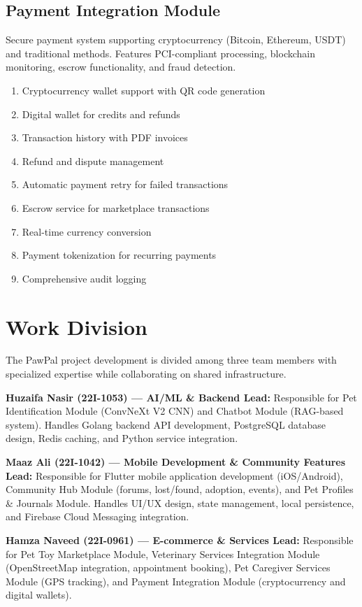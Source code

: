 \subsection{Payment Integration Module}
Secure payment system supporting cryptocurrency (Bitcoin, Ethereum, USDT) and traditional methods. Features PCI-compliant processing, blockchain monitoring, escrow functionality, and fraud detection.
\begin{enumerate}
    \item Cryptocurrency wallet support with QR code generation
    \item Digital wallet for credits and refunds
    \item Transaction history with PDF invoices
    \item Refund and dispute management
    \item Automatic payment retry for failed transactions
    \item Escrow service for marketplace transactions
    \item Real-time currency conversion
    \item Payment tokenization for recurring payments
    \item Comprehensive audit logging
\end{enumerate}

\section{Work Division}

The PawPal project development is divided among three team members with specialized expertise while collaborating on shared infrastructure.

\textbf{Huzaifa Nasir (22I-1053) --- AI/ML \& Backend Lead:} Responsible for Pet Identification Module (ConvNeXt V2 CNN) and Chatbot Module (RAG-based system). Handles Golang backend API development, PostgreSQL database design, Redis caching, and Python service integration.

\textbf{Maaz Ali (22I-1042) --- Mobile Development \& Community Features Lead:} Responsible for Flutter mobile application development (iOS/Android), Community Hub Module (forums, lost/found, adoption, events), and Pet Profiles \& Journals Module. Handles UI/UX design, state management, local persistence, and Firebase Cloud Messaging integration.

\textbf{Hamza Naveed (22I-0961) --- E-commerce \& Services Lead:} Responsible for Pet Toy Marketplace Module, Veterinary Services Integration Module (OpenStreetMap integration, appointment booking), Pet Caregiver Services Module (GPS tracking), and Payment Integration Module (cryptocurrency and digital wallets).

